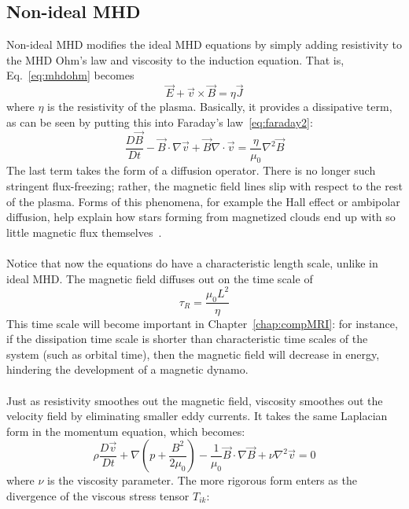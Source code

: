 \subsection{Non-ideal MHD} \label{ssec:nimhd}
Non-ideal MHD modifies the ideal MHD equations by simply adding resistivity to the MHD Ohm's law and viscosity to the induction equation. That is, Eq.~\ref{eq:mhdohm} becomes
\begin{equation}
  \vec E+\vec v\times\vec B=\eta\vec J
\end{equation}
where $\eta$ is the resistivity of the plasma. Basically, it provides a dissipative term, as can be seen by putting this into Faraday's law~\ref{eq:faraday2}:
\begin{equation}
  \frac{D\vec B}{Dt}-\vec B\cdot\nabla\vec v+\vec B\nabla\cdot\vec v=\frac{\eta}{\mu_0}\nabla^2\vec B
\end{equation}
The last term takes the form of a diffusion operator. There is no longer such stringent flux-freezing; rather, the magnetic field lines slip with respect to the rest of the plasma. Forms of this phenomena, for example the Hall effect or ambipolar diffusion, help explain how stars forming from magnetized clouds end up with so little magnetic flux themselves~\cite{KunzHW4}.\\
\\
Notice that now the equations do have a characteristic length scale, unlike in ideal MHD. The magnetic field diffuses out on the time scale of
\begin{equation}
  \tau_R=\frac{\mu_0L^2}{\eta}
\end{equation}
This time scale will become important in Chapter~\ref{chap:compMRI}: for instance, if the dissipation time scale is shorter than characteristic time scales of the system (such as orbital time), then the magnetic field will decrease in energy, hindering the development of a magnetic dynamo. \\
\\
Just as resistivity smoothes out the magnetic field, viscosity smoothes out the velocity field by eliminating smaller eddy currents. It takes the same Laplacian form in the momentum equation, which becomes:
\begin{equation}
  \rho\frac{D\vec v}{Dt}+\nabla\left(p+\frac{B^2}{2\mu_0}\right)-\frac1{\mu_0}\vec B\cdot\nabla\vec B+\nu\nabla^2\vec v=0 \label{eq:momvisc}
\end{equation}
where $\nu$ is the viscosity parameter. The more rigorous form enters as the divergence of the viscous stress tensor $T_{ik}$:
